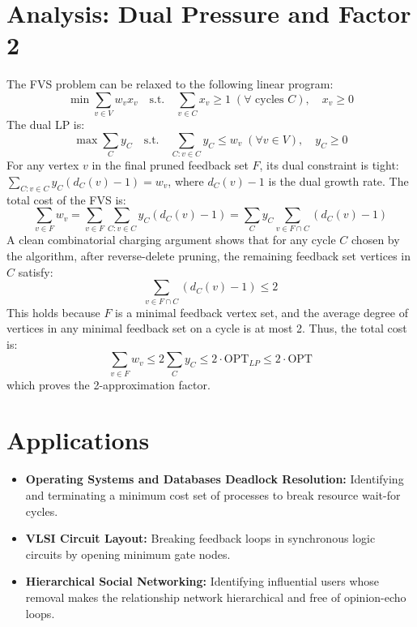 \documentclass[11pt,oneside]{book}
\begin{document}
\section{Analysis: Dual Pressure and Factor 2}
The FVS problem can be relaxed to the following linear program:
\[
\min \sum_{v \in V} w_v x_v \quad \text{s.t.} \quad \sum_{v \in C} x_v \ge 1 \; (\forall \text{ cycles } C), \quad x_v \ge 0
\]
The dual LP is:
\[
\max \sum_{C} y_C \quad \text{s.t.} \quad \sum_{C: v \in C} y_C \le w_v \; (\forall v \in V), \quad y_C \ge 0
\]
For any vertex $v$ in the final pruned feedback set $F$, its dual constraint is tight: $\sum_{C: v \in C} y_C (d_C(v) - 1) = w_v$, where $d_C(v) - 1$ is the dual growth rate. The total cost of the FVS is:
\[
\sum_{v \in F} w_v = \sum_{v \in F} \sum_{C: v \in C} y_C (d_C(v) - 1) = \sum_{C} y_C \sum_{v \in F \cap C} (d_C(v) - 1)
\]
A clean combinatorial charging argument shows that for any cycle $C$ chosen by the algorithm, after reverse-delete pruning, the remaining feedback set vertices in $C$ satisfy:
\[
\sum_{v \in F \cap C} (d_C(v) - 1) \le 2
\]
This holds because $F$ is a minimal feedback vertex set, and the average degree of vertices in any minimal feedback set on a cycle is at most 2. Thus, the total cost is:
\[
\sum_{v \in F} w_v \le 2 \sum_{C} y_C \le 2 \cdot \text{OPT}_{LP} \le 2 \cdot \text{OPT}
\]
which proves the 2-approximation factor.

\section{Applications}
\begin{itemize}
    \item \textbf{Operating Systems and Databases Deadlock Resolution:} Identifying and terminating a minimum cost set of processes to break resource wait-for cycles.
    \item \textbf{VLSI Circuit Layout:} Breaking feedback loops in synchronous logic circuits by opening minimum gate nodes.
    \item \textbf{Hierarchical Social Networking:} Identifying influential users whose removal makes the relationship network hierarchical and free of opinion-echo loops.
\end{itemize}
\end{document}
